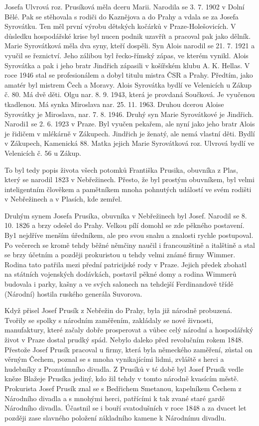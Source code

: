 \documentclass[../dejiny-rodu-prusiku.tex]{subfiles}
\begin{document}
Josefa Ulvrová roz. Prusíková měla dceru Marii. Narodila se 3. 7. 1902 v Dolní Bělé. Pak se stěhovala s rodiči do Kaznějova a do Prahy a vdala se za Josefa Syrovátku. Ten měl první výrobu dětských kočárků v Praze-Hole­šovicích. V důsledku hospodářské krise byl nucen pod­nik uzavřít a pracoval pak jako dělník. Marie Syrovátková měla dva syny, kteří dospěli. Syn Alois narodil se 21. 7. 1921 a vyučil se řeznictví. Jeho zálibou byl řecko-římský zápas, ve kterém vynikl. Alois Syrovátka a pak i jeho bratr Jindřich zápasili v košířském klubu A. K. Hellas. V roce 1946 stal se profesionálem a do­byl titulu mistra ČSR a Prahy. Předtím, jako amatér byl mistrem Čech a Moravy. Alois Syrovátka bydlí ve Velenicích u Zákup č. 80. Má dvě děti. Olgu nar. 8. 9. 1943, která je provdaná Součková. Je vyučenou tkadlenou. Má synka Miroslava nar. 25. 11. 1963. Druhou dcerou Aloise Syrovátky je Miroslava, nar. 7. 8. 1946. Druhý syn Marie Syrovátkové je Jindřich. Narodi1 se 2. 6. 1923 v Praze. Byl vyučen pekařem, ale nyní jako jeho bratr Alois je řidičem v mlékárně v Zákupech. Jindřich je ženatý, ale nemá vlastní děti. Bydlí v Zákupech, Kamenická 88. Matka jejich Marie Syrovátková roz. Ulvrová bydlí ve Velenicích č. 56 u Zákup.

To byl tedy popis života všech potomků Františka Prusika, obuvníka z Plas, který se narodil 1823 v Nebřežinech. Přesto, že byl prostým obuvníkem, byl velmi inteligentním člověkem a pamětníkem mnoha pohnutých událostí ve svém rodišti v Nebřežinech a v Plasích, kde zemřel.

Druhým synem Josefa Prusíka, obuvníka v Nebřežinech byl Josef. Narodil se 8. 10. 1826 a brzy odešel do Prahy. Velkou pílí domohl se zde pěkného postavení. By1 nejdříve menším úředníkem, ale pro svou snahu a znalosti rychle postupoval. Po večerech se kromě tehdy běžné němčiny naučil i francouzštině a italštině a stal se brzy účetním a později prokuristou u tehdy velmi známé firmy Wimmer. Rodina tato patřila mezi přední patricijské rody v Praze. Jejich předek zbohatl na státních vojenských dodávkách, postavil pěkné domy a rodina Wimmerů budovala i parky, kašny a ve svých salonech na tehdejší Ferdinandově třídě (Národní) hostila ruského generála Suvorova.

Když přisel Josef Prusík z Nebřežin do Prahy, byla již národně probuzená. Tvořily se spolky s národním zaměřením, zakládaly se nové živnosti, manufaktury, které začaly dobře prosperovat a vůbec celý národní a hos­podářský život v Praze dostal prudký spád. Nebylo daleko před revolučním rokem 1848. Přestože Josef Prusík pracoval u firmy, která byla německého zaměření, zůstal on věrným Čechem, poznal se s mnoha vynikajícími lidmi, zvláště s herci a hudebníky z Prozatímního divadla. Z Prusíků v té době byl Josef Prusík vedle kněze Blažeje Prusíka jediný, kdo žil tehdy v tomto národně kvasícím městě. Prokurista Josef Prusík znal se s Bedřichem Smetanou, kapelníkem Čechem z Národního divadla a s mnohými herci, patřícími k tak zvané staré gardě Národního divadla. Účastnil se i bouří svatodušních v roce 1848 a za dvacet let později zase slavného položení základ­ního kamene k Národnímu divadlu.
\end{document}
